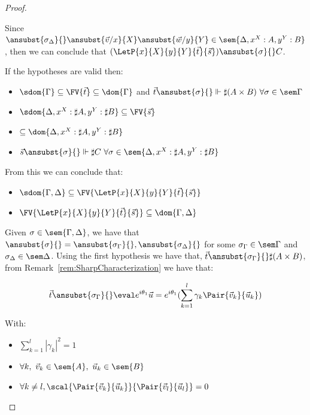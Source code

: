 \begin{proof}
\begin{description}
    Since $\ansubst{\sigma_\Delta}{}\ansubst{\vec{v}/x}{X}\ansubst{\vec{w}/y}{Y}\in\sem{\Delta,{x}^{X}:A,{y}^Y:B}$, then we can conclude that $(\LetP{x}{X}{y}{Y}{\vec{t}}{\vec{s}})\ansubst{\sigma}{}\real C$.

    \item[LetTens] If the hypotheses are valid then:
    \begin{itemize}
        \item $\sdom{\Gamma}\subseteq \FV{\vec t} \subseteq \dom{\Gamma}$ and $\vec t \ansubst{\sigma}{}\Vdash \sharp(A\times B)\ \forall \sigma\in\sem\Gamma$
        \item $\sdom{\Delta, {x}^{X}:\sharp A, {y}^{Y}:\sharp B}\subseteq \FV{\vec s}$
        \item $\subseteq \dom{\Delta, {x}^{X}:\sharp A, {y}^{Y}:\sharp B}$
        \item $\vec s \ansubst{\sigma}{}\Vdash \sharp C\ \forall \sigma\in\sem{\Delta, {x}^{X}:\sharp A, {y}^{Y}:\sharp B}$
    \end{itemize}
    
    From this we can conclude that:
    \begin{itemize}
        \item $\sdom{\Gamma,\Delta}\subseteq\FV{\LetP{x}{X}{y}{Y}{\vec{t}}{\vec{s}}}$
        \item $\FV{\LetP{x}{X}{y}{Y}{\vec{t}}{\vec{s}}}\subseteq\dom{\Gamma,\Delta}$
    \end{itemize}
    
    Given $\sigma\in\sem{\Gamma,\Delta}$, we have that $\ansubst{\sigma}{}=\ansubst{\sigma_\Gamma}{},\ansubst{\sigma_\Delta}{}$ for some $\sigma_\Gamma\in\sem\Gamma$ and $\sigma_\Delta\in\sem\Delta$. Using the first hypothesis we have that, $\vec t\ansubst{\sigma_\Gamma}{}\real \sharp(A\times B)$, from Remark~\ref{rem:SharpCharacterization} we have that:
    
    \[\vec t\ansubst{\sigma_\Gamma}{}\eval e^{i\theta_1}\vec{u}=e^{i\theta_1}(\sum_{k=1}^{l} \gamma_k \Pair{\vec{v}_{k}}{\vec{u}_{k}})\] 
    
    With:
    \begin{itemize}
        \item $\sum_{k=1}^{l} |\gamma_k|^2 = 1$
        \item $\forall k,\ \vec{v}_{k}\in\sem{A},\ \vec{u}_{k}\in\sem{B}$
        \item $\forall k\neq l, \scal{\Pair{\vec{v}_{k}}{\vec{u}_{k}}}{\Pair{\vec{v}_{l}}{\vec{u}_{l}}}= 0$
    \end{itemize}
    

\end{description}
\end{proof}
